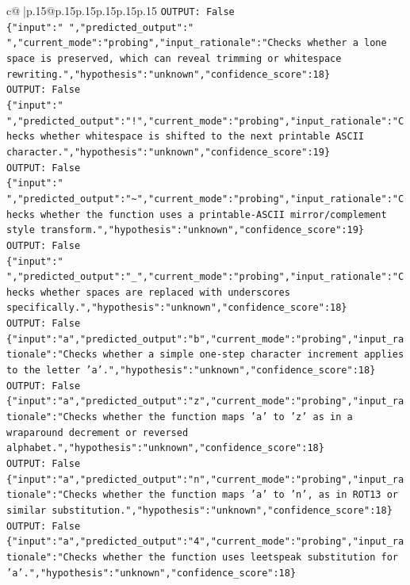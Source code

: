 \documentclass{article}
\begin{document}
{\begin{supertabular}{c@{$\;$}|p{.15\linewidth}@{}p{.15\linewidth}p{.15\linewidth}p{.15\linewidth}p{.15\linewidth}p{.15\linewidth}}
{{{\texttt{OUTPUT: False} \\
\texttt{\{"input":" ","predicted\_output":" ","current\_mode":"probing","input\_rationale":"Checks whether a lone space is preserved, which can reveal trimming or whitespace rewriting.","hypothesis":"unknown","confidence\_score":18\}} \\
\texttt{OUTPUT: False} \\
\texttt{\{"input":" ","predicted\_output":"!","current\_mode":"probing","input\_rationale":"Checks whether whitespace is shifted to the next printable ASCII character.","hypothesis":"unknown","confidence\_score":19\}} \\
\texttt{OUTPUT: False} \\
\texttt{\{"input":" ","predicted\_output":"\textasciitilde{}","current\_mode":"probing","input\_rationale":"Checks whether the function uses a printable{-}ASCII mirror/complement style transform.","hypothesis":"unknown","confidence\_score":19\}} \\
\texttt{OUTPUT: False} \\
\texttt{\{"input":" ","predicted\_output":"\_","current\_mode":"probing","input\_rationale":"Checks whether spaces are replaced with underscores specifically.","hypothesis":"unknown","confidence\_score":18\}} \\
\texttt{OUTPUT: False} \\
\texttt{\{"input":"a","predicted\_output":"b","current\_mode":"probing","input\_rationale":"Checks whether a simple one{-}step character increment applies to the letter 'a'.","hypothesis":"unknown","confidence\_score":18\}} \\
\texttt{OUTPUT: False} \\
\texttt{\{"input":"a","predicted\_output":"z","current\_mode":"probing","input\_rationale":"Checks whether the function maps 'a' to 'z' as in a wraparound decrement or reversed alphabet.","hypothesis":"unknown","confidence\_score":18\}} \\
\texttt{OUTPUT: False} \\
\texttt{\{"input":"a","predicted\_output":"n","current\_mode":"probing","input\_rationale":"Checks whether the function maps 'a' to 'n', as in ROT13 or similar substitution.","hypothesis":"unknown","confidence\_score":18\}} \\
\texttt{OUTPUT: False} \\
\texttt{\{"input":"a","predicted\_output":"4","current\_mode":"probing","input\_rationale":"Checks whether the function uses leetspeak substitution for 'a'.","hypothesis":"unknown","confidence\_score":18\}} \\
}}}
\end{supertabular}}
\end{document}
